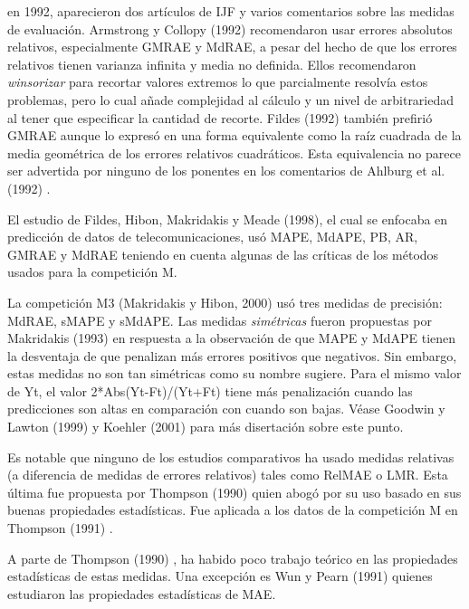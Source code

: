 \documentclass{llncs}
\begin{document}
en 1992, aparecieron dos artículos de IJF y varios comentarios sobre las medidas de evaluación. Armstrong y Collopy (1992) \cite{Armstrong199269} recomendaron usar errores absolutos relativos, especialmente GMRAE y MdRAE, a pesar del hecho de que los errores relativos tienen varianza infinita y media no definida. Ellos recomendaron \emph{winsorizar} para recortar valores extremos lo que parcialmente resolvía estos problemas, pero lo cual añade complejidad al cálculo y un nivel de arbitrariedad al tener que especificar la cantidad de recorte. Fildes (1992) \cite{Fildes199281} también prefirió GMRAE aunque lo expresó en una forma equivalente como la raíz cuadrada de la media geométrica de los errores relativos cuadráticos. Esta equivalencia no parece ser advertida por ninguno de los ponentes en los comentarios de Ahlburg et al. (1992) \cite{Chatfield1992100}. 

El estudio de Fildes, Hibon, Makridakis y Meade (1998), el cual se enfocaba en predicción de datos de telecomunicaciones, usó MAPE, MdAPE, PB, AR, GMRAE y MdRAE teniendo en cuenta algunas de las críticas de los métodos usados para la competición M.

La competición M3 (Makridakis y Hibon, 2000) \cite{Makridakis2000451} usó tres medidas de precisión: MdRAE, sMAPE y sMdAPE. Las medidas \emph{simétricas} fueron propuestas por Makridakis (1993) \cite{Makridakis1993527} en respuesta a la observación de que MAPE y MdAPE tienen la desventaja de que penalizan más errores positivos que negativos. Sin embargo, estas medidas no son tan simétricas como su nombre sugiere. Para el mismo valor de Yt, el valor 2*Abs(Yt-Ft)/(Yt+Ft) tiene más penalización cuando las predicciones son altas en comparación con cuando son bajas. Véase Goodwin y Lawton (1999) \cite{Goodwin1999405} y Koehler (2001) \cite{Koehler2001269} para más disertación sobre este punto.

Es notable que ninguno de los estudios comparativos ha usado medidas relativas (a diferencia de medidas de errores relativos) tales como RelMAE o LMR. Esta última fue propuesta por Thompson (1990) \cite{Thompson1990219}quien abogó por su uso basado en sus buenas propiedades estadísticas. Fue aplicada a los datos de la competición M en Thompson (1991) \cite{Thompson1991331}.

A parte de Thompson (1990) \cite{Thompson1990219}, ha habido poco trabajo teórico en las propiedades estadísticas de estas medidas. Una excepción es Wun y Pearn (1991) quienes estudiaron las propiedades estadísticas de MAE.
\end{document}
